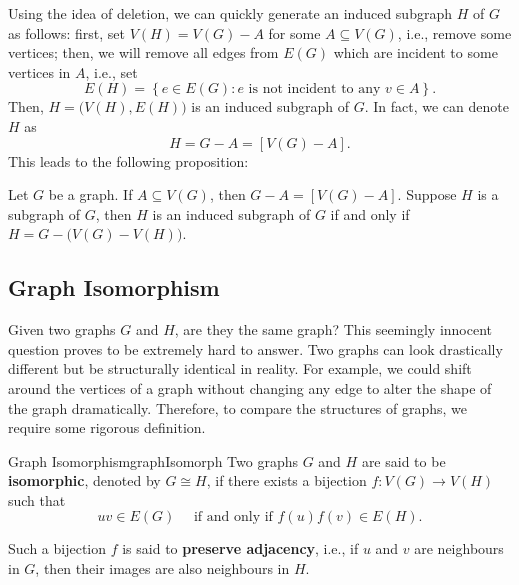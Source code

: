 \documentclass[math]{amznotes}
\theoremstyle{remark}
\begin{document}
Using the idea of deletion, we can quickly generate an induced subgraph $H$ of $G$ as follows: first, set $V(H) = V(G) - A$ for some $A \subseteq V(G)$, i.e., remove some vertices; then, we will remove all edges from $E(G)$ which are incident to some vertices in $A$, i.e., set
\begin{equation*}
    E(H) = \left\{e \in E(G) \colon e \textrm{ is not incident to any } v \in A\right\}.
\end{equation*}
Then, $H = \bigl(V(H), E(H)\bigr)$ is an induced subgraph of $G$. In fact, we can denote $H$ as
\begin{equation*}
    H = G - A = [V(G) - A].
\end{equation*}
This leads to the following proposition:
\begin{probox}{}{}
    Let $G$ be a graph. If $A \subseteq V(G)$, then $G - A = [V(G) - A]$. Suppose $H$ is a subgraph of $G$, then $H$ is an induced subgraph of $G$ if and only if $H = G - \bigl(V(G) - V(H)\bigr)$.
\end{probox}
\subsection{Graph Isomorphism}
Given two graphs $G$ and $H$, are they the same graph? This seemingly innocent question proves to be extremely hard to answer. Two graphs can look drastically different but be structurally identical in reality. For example, we could shift around the vertices of a graph without changing any edge to alter the shape of the graph dramatically. Therefore, to compare the structures of graphs, we require some rigorous definition.
\begin{dfnbox}{Graph Isomorphism}{graphIsomorph}
    Two graphs $G$ and $H$ are said to be {\color{red} \textbf{isomorphic}}, denoted by $G \cong H$, if there exists a bijection $f \colon V(G) \to V(H)$ such that
    \begin{equation*}
        uv \in E(G) \quad\textrm{ if and only if } f(u)f(v) \in E(H).
    \end{equation*}
\end{dfnbox}
Such a bijection $f$ is said to \textbf{preserve adjacency}, i.e., if $u$ and $v$ are neighbours in $G$, then their images are also neighbours in $H$.
\end{document}
